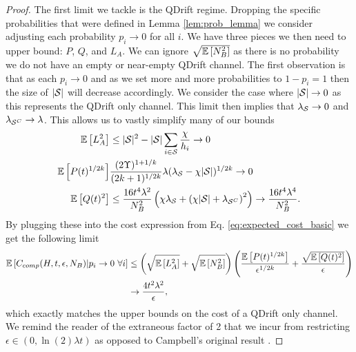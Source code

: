 \begin{proof}
The first limit we tackle is the QDrift regime. Dropping the specific probabilities that were defined in Lemma \ref{lem:prob_lemma} we consider adjusting each probability $p_i \to 0$ for all $i$. We have three pieces we then need to upper bound: $P$, $Q$, and $L_A$. We can ignore $\sqrt{\mathbb{E}\left[ N_B^2 \right]}$ as there is no probability we do not have an empty or near-empty QDrift channel. The first observation is that as each $p_i \to 0$ and as we set more and more probabilities to $1 - p_i = 1$ then the size of $|\mathcal{S}|$ will decrease accordingly. We consider the case where $|\mathcal{S}| \to 0$ as this represents the QDrift only channel. This limit then implies that $\lambda_{\mathcal{S}} \to 0$ and $\lambda_{\mathcal{S}^C} \to \lambda$. This allows us to vastly simplify many of our bounds
\begin{align}
    \mathbb{E}\left[ L_A^2 \right] &\leq |\mathcal{S}|^2 - |\mathcal{S}| \sum_{i \in \mathcal{S}} \frac{\chi}{h_i} \to 0 \\
    \mathbb{E}\left[ P(t)^{1/2k} \right] & \frac{(2 \Upsilon)^{1 + 1/k}}{(2k+1)^{1/2k}} \lambda (\lambda_{\mathcal{S}} - \chi |\mathcal{S}|)^{1/2k} \to 0 \\
    \mathbb{E}\left[ Q(t)^2 \right] &\leq \frac{16 t^4 \lambda^2}{N_B^2} \left( \chi \lambda_{\mathcal{S}} + \left( \chi |\mathcal{S}| + \lambda_{\mathcal{S}^C} \right)^2 \right) \to \frac{16 t^4 \lambda^4}{N_B^2}.
\end{align}
By plugging these into the cost expression from Eq. \ref{eq:expected_cost_basic} we get the following limit
\begin{align}
    \mathbb{E}\left[ C_{comp}(H, t, \epsilon, N_B) | p_i \to 0 \text{ } \forall i \right] &\leq \left( \sqrt{\mathbb{E}\left[ L_A^2 \right]} + \sqrt{\mathbb{E}\left[ N_B^2 \right]} \right) \left( \frac{\mathbb{E}\left[ P(t)^{1/2k} \right]}{\epsilon^{1/2k}} + \frac{\sqrt{\mathbb{E}\left[ Q(t)^2 \right]}}{\epsilon} \right) \\
    &\to \frac{4 t^2 \lambda^2}{\epsilon},
\end{align}
which exactly matches the upper bounds on the cost of a QDrift only channel. We remind the reader of the extraneous factor of 2 that we incur from restricting $\epsilon \in (0, \ln(2) \lambda t)$ as opposed to Campbell's original result \cite{qdriftCampbell}. 


\end{proof}
